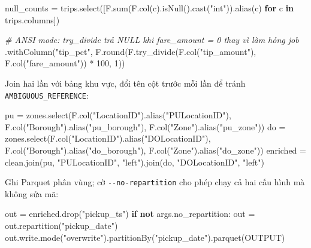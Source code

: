 \documentclass[
  12pt,
  a4paper,
]{article}
\newenvironment{Shaded}{}{}
\newcommand{\BuiltInTok}[1]{\textcolor[rgb]{0.00,0.50,0.00}{#1}}
\newcommand{\CommentTok}[1]{\textcolor[rgb]{0.38,0.63,0.69}{\textit{#1}}}
\newcommand{\ControlFlowTok}[1]{\textcolor[rgb]{0.00,0.44,0.13}{\textbf{#1}}}
\newcommand{\DecValTok}[1]{\textcolor[rgb]{0.25,0.63,0.44}{#1}}
\newcommand{\KeywordTok}[1]{\textcolor[rgb]{0.00,0.44,0.13}{\textbf{#1}}}
\newcommand{\NormalTok}[1]{#1}
\newcommand{\OperatorTok}[1]{\textcolor[rgb]{0.40,0.40,0.40}{#1}}
\newcommand{\StringTok}[1]{\textcolor[rgb]{0.25,0.44,0.63}{#1}}
\begin{document}
\begin{Shaded}
\begin{Highlighting}[]
\NormalTok{null\_counts }\OperatorTok{=}\NormalTok{ trips.select([F.}\BuiltInTok{sum}\NormalTok{(F.col(c).isNull().cast(}\StringTok{"int"}\NormalTok{)).alias(c)}
                            \ControlFlowTok{for}\NormalTok{ c }\KeywordTok{in}\NormalTok{ trips.columns])}

\CommentTok{\# ANSI mode: try\_divide trả NULL khi fare\_amount = 0 thay vì làm hỏng job}
\NormalTok{.withColumn(}\StringTok{"tip\_pct"}\NormalTok{,}
\NormalTok{            F.}\BuiltInTok{round}\NormalTok{(F.try\_divide(F.col(}\StringTok{"tip\_amount"}\NormalTok{), F.col(}\StringTok{"fare\_amount"}\NormalTok{)) }\OperatorTok{*} \DecValTok{100}\NormalTok{, }\DecValTok{1}\NormalTok{))}
\end{Highlighting}
\end{Shaded}

Join hai lần với bảng khu vực, đổi tên cột trước mỗi lần để tránh
\texttt{AMBIGUOUS\_}\allowbreak{}\texttt{REFERENCE}\allowbreak{}:

\begin{Shaded}
\begin{Highlighting}[]
\NormalTok{pu }\OperatorTok{=}\NormalTok{ zones.select(F.col(}\StringTok{"LocationID"}\NormalTok{).alias(}\StringTok{"PULocationID"}\NormalTok{),}
\NormalTok{                  F.col(}\StringTok{"Borough"}\NormalTok{).alias(}\StringTok{"pu\_borough"}\NormalTok{), F.col(}\StringTok{"Zone"}\NormalTok{).alias(}\StringTok{"pu\_zone"}\NormalTok{))}
\NormalTok{do }\OperatorTok{=}\NormalTok{ zones.select(F.col(}\StringTok{"LocationID"}\NormalTok{).alias(}\StringTok{"DOLocationID"}\NormalTok{),}
\NormalTok{                  F.col(}\StringTok{"Borough"}\NormalTok{).alias(}\StringTok{"do\_borough"}\NormalTok{), F.col(}\StringTok{"Zone"}\NormalTok{).alias(}\StringTok{"do\_zone"}\NormalTok{))}
\NormalTok{enriched }\OperatorTok{=}\NormalTok{ clean.join(pu, }\StringTok{"PULocationID"}\NormalTok{, }\StringTok{"left"}\NormalTok{).join(do, }\StringTok{"DOLocationID"}\NormalTok{, }\StringTok{"left"}\NormalTok{)}
\end{Highlighting}
\end{Shaded}

Ghi Parquet phân vùng; cờ \texttt{-\/-no-repartition}\allowbreak{} cho
phép chạy cả hai cấu hình mà không sửa mã:

\begin{Shaded}
\begin{Highlighting}[]
\NormalTok{out }\OperatorTok{=}\NormalTok{ enriched.drop(}\StringTok{"pickup\_ts"}\NormalTok{)}
\ControlFlowTok{if} \KeywordTok{not}\NormalTok{ args.no\_repartition:}
\NormalTok{    out }\OperatorTok{=}\NormalTok{ out.repartition(}\StringTok{"pickup\_date"}\NormalTok{)}
\NormalTok{out.write.mode(}\StringTok{"overwrite"}\NormalTok{).partitionBy(}\StringTok{"pickup\_date"}\NormalTok{).parquet(OUTPUT)}
\end{Highlighting}
\end{Shaded}
\end{document}

